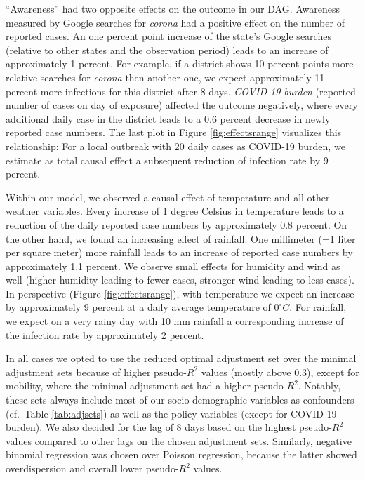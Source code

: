 \documentclass[]{elsarticle} %
\begin{document}
``Awareness'' had two opposite effects on the outcome in our DAG. Awareness measured by Google searches for \emph{corona} had a positive effect on the number of reported cases. An one percent point increase of the state's Google searches (relative to other states and the observation period) leads to an increase of approximately 1 percent. For example, if a district shows 10 percent points more relative searches for \emph{corona} then another one, we expect approximately 11 percent more infections for this district after 8 days. \emph{COVID-19 burden} (reported number of cases on day of exposure) affected the outcome negatively, where every additional daily case in the district leads to a 0.6 percent decrease in newly reported case numbers. The last plot in Figure \ref{fig:effectsrange} visualizes this relationship: For a local outbreak with 20 daily cases as COVID-19 burden, we estimate as total causal effect a subsequent reduction of infection rate by 9 percent.

Within our model, we observed a causal effect of temperature and all other weather variables. Every increase of 1 degree Celsius in temperature leads to a reduction of the daily reported case numbers by approximately 0.8 percent. On the other hand, we found an increasing effect of rainfall: One millimeter (=1 liter per square meter) more rainfall leads to an increase of reported case numbers by approximately 1.1 percent. We observe small effects for humidity and wind as well (higher humidity leading to fewer cases, stronger wind leading to less cases). In perspective (Figure \ref{fig:effectsrange}), with temperature we expect an increase by approximately 9 percent at a daily average temperature of \(0^{\circ}C\). For rainfall, we expect on a very rainy day with 10 mm rainfall a corresponding increase of the infection rate by approximately 2 percent.

In all cases we opted to use the reduced optimal adjustment set over the minimal adjustment sets because of higher pseudo-\(R^2\) values (mostly above 0.3), except for mobility, where the minimal adjustment set had a higher pseudo-\(R^2\). Notably, these sets always include most of our socio-demographic variables as confounders (cf.~Table \ref{tab:adjsets}) as well as the policy variables (except for COVID-19 burden). We also decided for the lag of 8 days based on the highest pseudo-\(R^2\) values compared to other lags on the chosen adjustment sets. Similarly, negative binomial regression was chosen over Poisson regression, because the latter showed overdispersion and overall lower pseudo-\(R^2\) values.
\end{document}
